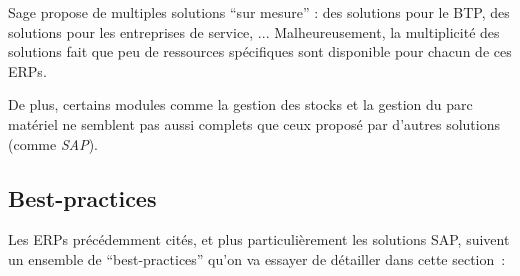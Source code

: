             Sage propose de multiples solutions ``sur mesure'' : des solutions pour le BTP, des solutions pour les entreprises de service, ... Malheureusement, la multiplicité des solutions fait que peu de ressources spécifiques sont disponible pour chacun de ces ERPs.

            De plus, certains modules comme la gestion des stocks et la gestion du parc matériel ne semblent pas aussi complets que ceux proposé par d'autres solutions (comme \textit{SAP}).


    \subsection{Best-practices}

        Les ERPs précédemment cités, et plus particulièrement les solutions SAP, suivent un ensemble de ``best-practices'' qu'on va essayer de détailler dans cette section~:


